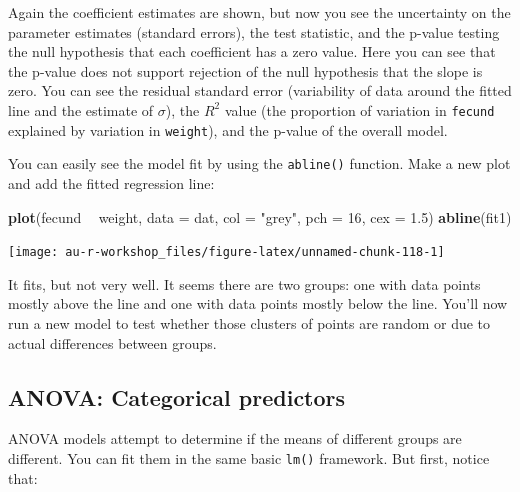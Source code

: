 \documentclass[]{book}
\newenvironment{Shaded}{\begin{snugshade}}{\end{snugshade}}
\newcommand{\DataTypeTok}[1]{\textcolor[rgb]{0.13,0.29,0.53}{#1}}
\newcommand{\DecValTok}[1]{\textcolor[rgb]{0.00,0.00,0.81}{#1}}
\newcommand{\FloatTok}[1]{\textcolor[rgb]{0.00,0.00,0.81}{#1}}
\newcommand{\KeywordTok}[1]{\textcolor[rgb]{0.13,0.29,0.53}{\textbf{#1}}}
\newcommand{\NormalTok}[1]{#1}
\newcommand{\OperatorTok}[1]{\textcolor[rgb]{0.81,0.36,0.00}{\textbf{#1}}}
\newcommand{\StringTok}[1]{\textcolor[rgb]{0.31,0.60,0.02}{#1}}
\begin{document}
Again the coefficient estimates are shown, but now you see the uncertainty on the parameter estimates (standard errors), the test statistic, and the p-value testing the null hypothesis that each coefficient has a zero value. Here you can see that the p-value does not support rejection of the null hypothesis that the slope is zero. You can see the residual standard error (variability of data around the fitted line and the estimate of \(\sigma\)), the \(R^2\) value (the proportion of variation in \texttt{fecund} explained by variation in \texttt{weight}), and the p-value of the overall model.

You can easily see the model fit by using the \texttt{abline()} function. Make a new plot and add the fitted regression line:

\begin{Shaded}
\begin{Highlighting}[]
\KeywordTok{plot}\NormalTok{(fecund }\OperatorTok{~}\StringTok{ }\NormalTok{weight, }\DataTypeTok{data =}\NormalTok{ dat, }\DataTypeTok{col =} \StringTok{"grey"}\NormalTok{, }\DataTypeTok{pch =} \DecValTok{16}\NormalTok{, }\DataTypeTok{cex =} \FloatTok{1.5}\NormalTok{)}
\KeywordTok{abline}\NormalTok{(fit1)}
\end{Highlighting}
\end{Shaded}

\begin{center}\texttt{[image: au-r-workshop\_files/figure-latex/unnamed-chunk-118-1]} \end{center}

It fits, but not very well. It seems there are two groups: one with data points mostly above the line and one with data points mostly below the line. You'll now run a new model to test whether those clusters of points are random or due to actual differences between groups.

\hypertarget{anova}{%
\subsection{ANOVA: Categorical predictors}\label{anova}}

ANOVA models attempt to determine if the means of different groups are different. You can fit them in the same basic \texttt{lm()} framework. But first, notice that:

\begin{Shaded}
\end{Shaded}
\end{document}
